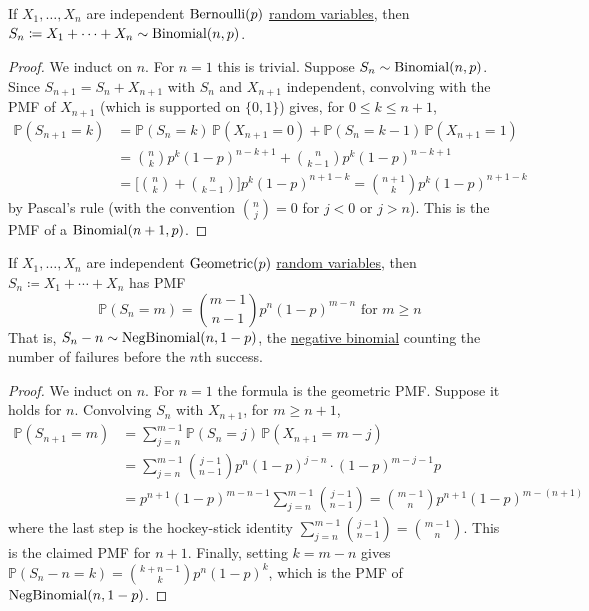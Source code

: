   \begin{theorem}
    \label{thm:sum-of-independent-bernoullis-is-binomial}
    If $X_1, \ldots, X_n$ are independent $\operatorname{Bernoulli}(p)$ \hyperref[def:indicator-bernoulli-random-variable]{random variables}, then $S_n \coloneqq X_1 + \cdots + X_n \sim \operatorname{Binomial}(n, p)$. 
  \end{theorem}
  \begin{proof}
    We induct on $n$. For $n = 1$ this is trivial. Suppose $S_n \sim \operatorname{Binomial}(n, p)$. Since $S_{n+1} = S_n + X_{n+1}$ with $S_n$ and $X_{n+1}$ independent, convolving with the PMF of $X_{n+1}$ (which is supported on $\{0, 1\}$) gives, for $0 \leq k \leq n+1$, 
    \begin{align*}
      \mathbb{P}(S_{n+1} = k) & = \mathbb{P}(S_n = k) \, \mathbb{P}(X_{n+1} = 0) + \mathbb{P}(S_n = k - 1) \, \mathbb{P}(X_{n+1} = 1) \\
      & = \binom{n}{k} p^k (1 - p)^{n - k + 1} + \binom{n}{k-1} p^{k} (1 - p)^{n - k + 1} \\
      & = \bigg[ \binom{n}{k} + \binom{n}{k - 1} \bigg] p^k (1 - p)^{n + 1 - k} = \binom{n+1}{k} p^k (1 - p)^{n+1-k}
    \end{align*}
    by Pascal's rule (with the convention $\binom{n}{j} = 0$ for $j < 0$ or $j > n$). This is the PMF of a $\operatorname{Binomial}(n+1, p)$. 
  \end{proof}

  \begin{theorem}
    \label{thm:sum-of-independent-geometrics-is-negative-binomial}
    If $X_1, \ldots, X_n$ are independent $\operatorname{Geometric}(p)$ \hyperref[def:geometric-random-variable]{random variables}, then $S_n \coloneqq X_1 + \cdots + X_n$ has PMF 
    \begin{equation}
      \mathbb{P}(S_n = m) = \binom{m - 1}{n - 1} p^n (1 - p)^{m - n} \text{ for } m \geq n
    \end{equation}
    That is, $S_n - n \sim \operatorname{NegBinomial}(n, 1 - p)$, the \hyperref[def:negative-binomial-distribution]{negative binomial} counting the number of failures before the $n$th success. 
  \end{theorem}
  \begin{proof}
    We induct on $n$. For $n = 1$ the formula is the geometric PMF. Suppose it holds for $n$. Convolving $S_n$ with $X_{n+1}$, for $m \geq n + 1$, 
    \begin{align*}
      \mathbb{P}(S_{n+1} = m) & = \sum_{j=n}^{m-1} \mathbb{P}(S_n = j) \, \mathbb{P}(X_{n+1} = m - j) \\
      & = \sum_{j=n}^{m-1} \binom{j-1}{n-1} p^n (1 - p)^{j - n} \cdot (1 - p)^{m - j - 1} p \\
      & = p^{n+1} (1 - p)^{m - n - 1} \sum_{j=n}^{m-1} \binom{j-1}{n-1} = \binom{m-1}{n} p^{n+1} (1 - p)^{m - (n+1)}
    \end{align*}
    where the last step is the hockey-stick identity $\sum_{j=n}^{m-1} \binom{j-1}{n-1} = \binom{m-1}{n}$. This is the claimed PMF for $n + 1$. Finally, setting $k = m - n$ gives $\mathbb{P}(S_n - n = k) = \binom{k + n - 1}{k} p^n (1-p)^k$, which is the PMF of $\operatorname{NegBinomial}(n, 1-p)$. 
  \end{proof}

